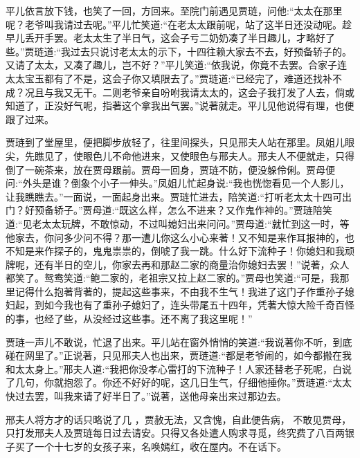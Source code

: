 \begin{parag}
    平儿依言放下钱，也笑了一回，方回来。至院门前遇见贾琏，问他:“太太在那里呢？老爷叫我请过去呢。”平儿忙笑道:“在老太太跟前呢，站了这半日还没动呢。趁早儿丢开手罢。老太太生了半日气，这会子亏二奶奶凑了半日趣儿，才略好了些。”贾琏道:“我过去只说讨老太太的示下，十四往赖大家去不去，好预备轿子的。又请了太太，又凑了趣儿，岂不好？”平儿笑道:“依我说，你竟不去罢。合家子连太太宝玉都有了不是，这会子你又填限去了。”贾琏道:“已经完了，难道还找补不成？况且与我又无干。二则老爷亲自吩咐我请太太的，这会子我打发了人去，倘或知道了，正没好气呢，指著这个拿我出气罢。”说著就走。平儿见他说得有理，也便跟了过来。
\end{parag}


\begin{parag}
    贾琏到了堂屋里，便把脚步放轻了，往里间探头，只见邢夫人站在那里。凤姐儿眼尖，先瞧见了，使眼色儿不命他进来，又使眼色与邢夫人。邢夫人不便就走，只得倒了一碗茶来，放在贾母跟前。贾母一回身，贾琏不防，便没躲伶俐。贾母便问:“外头是谁？倒象个小子一伸头。”凤姐儿忙起身说:“我也恍惚看见一个人影儿，让我瞧瞧去。”一面说，一面起身出来。贾琏忙进去，陪笑道:“打听老太太十四可出门？好预备轿子。”贾母道:“既这么样，怎么不进来？又作鬼作神的。”贾琏陪笑道:“见老太太玩牌，不敢惊动，不过叫媳妇出来问问。”贾母道:“就忙到这一时，等他家去，你问多少问不得？那一遭儿你这么小心来著！又不知是来作耳报神的，也不知是来作探子的，鬼鬼祟祟的，倒唬了我一跳。什么好下流种子！你媳妇和我顽牌呢，还有半日的空儿，你家去再和那赵二家的商量治你媳妇去罢！”说著，众人都笑了。鸳鸯笑道:“鲍二家的，老祖宗又拉上赵二家的。”贾母也笑道:“可是，我那里记得什么抱著背著的，提起这些事来，不由我不生气！我进了这门子作重孙子媳妇起，到如今我也有了重孙子媳妇了，连头带尾五十四年，凭著大惊大险千奇百怪的事，也经了些，从没经过这些事。还不离了我这里呢！”
\end{parag}


\begin{parag}
    贾琏一声儿不敢说，忙退了出来。平儿站在窗外悄悄的笑道:“我说著你不听，到底碰在网里了。”正说著，只见邢夫人也出来，贾琏道:“都是老爷闹的，如今都搬在我和太太身上。”邢夫人道:“我把你没孝心雷打的下流种子！人家还替老子死呢，白说了几句，你就抱怨了。你还不好好的呢，这几日生气，仔细他捶你。”贾琏道:“太太快过去罢，叫我来请了好半日了。”说著，送他母亲出来过那边去。
\end{parag}


\begin{parag}
    邢夫人将方才的话只略说了几 ，贾赦无法，又含愧，自此便告病， 不敢见贾母，只打发邢夫人及贾琏每日过去请安。只得又各处遣人购求寻觅，终究费了八百两银子买了一个十七岁的女孩子来，名唤嫣红，收在屋内。不在话下。
\end{parag}


